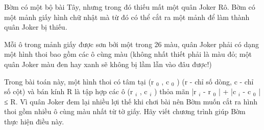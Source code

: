Bờm có một bộ bài Tây, nhưng trong đó thiếu mất một quân Joker Rô. Bờm có một mảnh giấy hình chữ nhật mà từ đó có thể cắt ra một mảnh để làm thành quân Joker bị thiếu.  

   Mỗi ô trong mảnh giấy được sơn bởi một trong 26 màu, quân Joker phải có dạng một hình thoi bao gồm các ô cùng màu (không nhất thiết phải là màu đỏ; một quân Joker màu đen hay xanh sẽ không bị lầm lẫn vào đâu được!)  

   Trong bài toán này, một hình thoi có tâm tại (r   $_    0   $   , c   $_    0   $   ) (r - chỉ số dòng, c - chỉ số cột) và bán kính R là tập hợp các ô (r   $_    i   $   , c   $_    i   $   ) thỏa mãn |r   $_    i   $   - r   $_    0   $   | + |c   $_    i   $   - c   $_    0   $   | ≤ R. Vì quân Joker đem lại nhiều lợi thế khi chơi bài nên Bờm muốn cắt ra hình thoi gồm nhiều ô cùng màu nhất từ tờ giấy. Hãy viết chương trình giúp Bờm thực hiện điều này.  

\